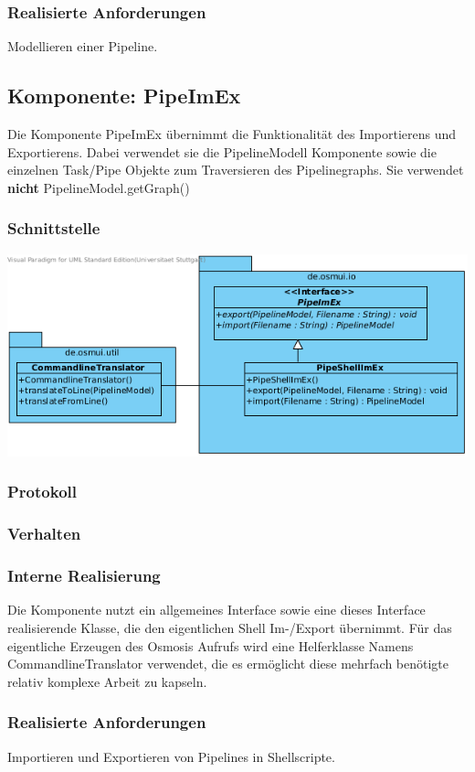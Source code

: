 \documentclass[a4paper,12pt]{scrartcl}
\begin{document}
\subsubsection{Realisierte Anforderungen}
Modellieren einer Pipeline.

\subsection{Komponente: PipeImEx}
Die Komponente PipeImEx übernimmt die Funktionalität des Importierens und Exportierens. Dabei verwendet sie die PipelineModell Komponente sowie die einzelnen Task/Pipe Objekte zum Traversieren des Pipelinegraphs. Sie verwendet \textbf{nicht} PipelineModel.getGraph()
\subsubsection{Schnittstelle}
\begin{center}
\includegraphics[width=17cm]{Schnittstelle_PipeImEx.png}
\end{center}
\subsubsection{Protokoll}
\subsubsection{Verhalten}
\subsubsection{Interne Realisierung}
Die Komponente nutzt ein allgemeines Interface sowie eine dieses Interface realisierende Klasse, die den eigentlichen Shell Im-/Export übernimmt. Für das eigentliche Erzeugen des Osmosis Aufrufs wird eine Helferklasse Namens CommandlineTranslator verwendet, die es ermöglicht diese mehrfach benötigte relativ komplexe Arbeit zu kapseln.
\subsubsection{Realisierte Anforderungen}
Importieren und Exportieren von Pipelines in Shellscripte.
\end{document}
